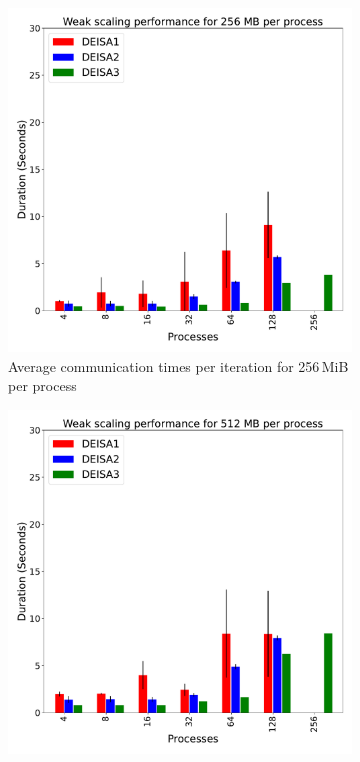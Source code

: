 \begin{figure}
\begin{subfigure}[b]{0.4\textwidth}
         \includegraphics[width=\textwidth, height=\textwidth]{figures/256MB_1vs2vs3.pdf}
         \caption{Average communication times per iteration for 256\,MiB per process}
         \label{fig:X2_256}
     \end{subfigure}
     \vfill
     \begin{subfigure}[b]{0.4\textwidth}
         \centering
         \includegraphics[width=\textwidth, height=\textwidth]{figures/512MB_1vs2vs3.pdf}

\end{subfigure}
\end{figure}
